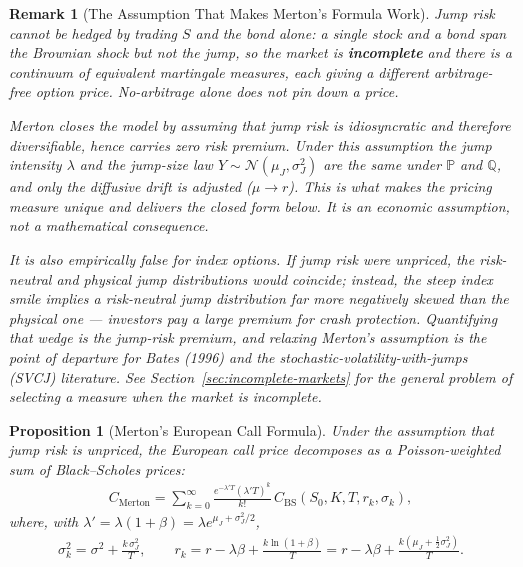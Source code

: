 \documentclass{report}
\theoremstyle{spacedplain}
\newtheorem{proposition}[theorem]{Proposition}
\theoremstyle{spaceddefinition}
\theoremstyle{spacedremark}
\newtheorem{remark}[theorem]{Remark}
\begin{document}
\begin{remark}[The Assumption That Makes Merton's Formula Work]
Jump risk cannot be hedged by trading $S$ and the bond alone: a single stock and a bond span the Brownian shock but not the jump, so the market is \textbf{incomplete} and there is a continuum of equivalent martingale measures, each giving a different arbitrage-free option price. No-arbitrage alone does not pin down a price.

Merton closes the model by \emph{assuming that jump risk is idiosyncratic and therefore diversifiable}, hence carries \emph{zero risk premium}. Under this assumption the jump intensity $\lambda$ and the jump-size law $Y \sim \mathcal{N}(\mu_J,\sigma_J^2)$ are \emph{the same under $\mathbb{P}$ and $\mathbb{Q}$}, and only the diffusive drift is adjusted ($\mu \to r$). This is what makes the pricing measure unique and delivers the closed form below. It is an economic assumption, not a mathematical consequence.

It is also empirically false for index options. If jump risk were unpriced, the risk-neutral and physical jump distributions would coincide; instead, the steep index smile implies a risk-neutral jump distribution far more negatively skewed than the physical one --- investors pay a large premium for crash protection. Quantifying that wedge is the jump-risk premium, and relaxing Merton's assumption is the point of departure for Bates (1996) and the stochastic-volatility-with-jumps (SVCJ) literature. See Section~\ref{sec:incomplete-markets} for the general problem of selecting a measure when the market is incomplete.
\end{remark}

\begin{proposition}[Merton's European Call Formula]
Under the assumption that jump risk is unpriced, the European call price decomposes as a Poisson-weighted sum of Black--Scholes prices:
\begin{align}
    C_{\text{Merton}} = \sum_{k=0}^{\infty} \frac{e^{-\lambda' T}(\lambda' T)^k}{k!}\, C_{\text{BS}}(S_0, K, T, r_k, \sigma_k),
\end{align}
where, with $\lambda' = \lambda(1+\beta) = \lambda e^{\mu_J + \sigma_J^2/2}$,
\begin{align}
    \sigma_k^2 = \sigma^2 + \frac{k\,\sigma_J^2}{T}, \qquad
    r_k = r - \lambda\beta + \frac{k\ln(1+\beta)}{T} = r - \lambda\beta + \frac{k\left(\mu_J + \tfrac{1}{2}\sigma_J^2\right)}{T}.
\end{align}
\end{proposition}
\end{document}
